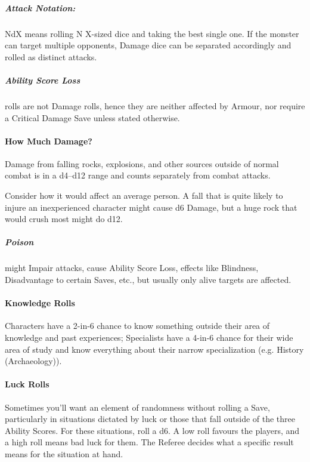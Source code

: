 \documentclass[itdr]{subfiles}
\begin{document}
\subparagraph{Attack Notation:} NdX means rolling N X-sized dice and taking the best single one. If the monster can target multiple opponents, Damage dice can be separated accordingly and rolled as distinct attacks.

\subparagraph{Ability Score Loss} rolls are not Damage rolls, hence they are neither affected by Armour, nor require a Critical Damage Save unless stated otherwise.

\vfill

\paragraph{How Much Damage?}
Damage from falling rocks, explosions, and other sources outside of normal combat is in a d4--d12 range and counts separately from combat attacks.

Consider how it would affect an average person. A fall that is quite likely to injure an inexperienced character might cause d6 Damage, but a huge rock that would crush most might do d12.

\subparagraph{Poison} might Impair attacks, cause Ability Score Loss, effects like Blindness, Disadvantage to certain Saves, etc., but usually only alive targets are affected.

\vfill

\paragraph{Knowledge Rolls}
Characters have a 2-in-6 chance to know something outside their area of knowledge and past experiences; Specialists have a 4-in-6 chance for their wide area of study and know everything about their narrow specialization (e.g. History (Archaeology)).

\vfill

\paragraph{Luck Rolls}
Sometimes you'll want an element of randomness without rolling a Save, particularly in situations dictated by luck or those that fall outside of the three Ability Scores. For these situations, roll a d6. A low roll favours the players, and a high roll means bad luck for them. The Referee decides what a specific result means for the situation at hand.

\vfill
\end{document}
